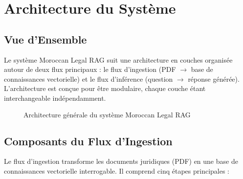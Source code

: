 \section{Architecture du Système}

\subsection{Vue d'Ensemble}

Le système Moroccan Legal RAG suit une architecture en couches organisée
autour de deux flux principaux : le flux d'ingestion (PDF $\rightarrow$ base
de connaissances vectorielle) et le flux d'inférence (question $\rightarrow$
réponse générée). L'architecture est conçue pour être modulaire, chaque
couche étant interchangeable indépendamment.

\begin{figure}[H]
\centering
{}
\caption{Architecture g\'en\'erale du syst\`eme Moroccan Legal RAG}
\end{figure}

\subsection{Composants du Flux d'Ingestion}

Le flux d'ingestion transforme les documents juridiques (PDF) en une base de
connaissances vectorielle interrogable. Il comprend cinq étapes principales :

